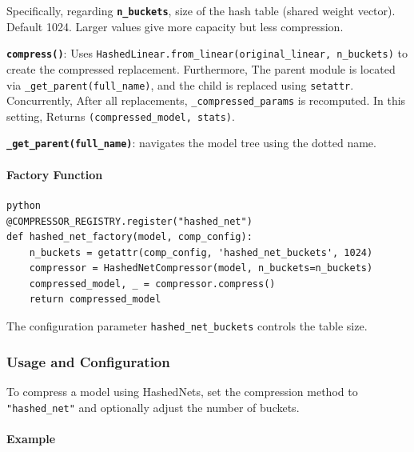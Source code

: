 Specifically, regarding \textbf{\texttt{n\_buckets}}, size of the hash table (shared weight vector). Default 1024. Larger values give more capacity but less compression.


\textbf{\texttt{compress()}}:
Uses \texttt{HashedLinear.from\_linear(original\_linear, n\_buckets)} to create the compressed replacement. Furthermore, The parent module is located via \texttt{\_get\_parent(full\_name)}, and the child is replaced using \texttt{setattr}. Concurrently, After all replacements, \texttt{\_compressed\_params} is recomputed. In this setting, Returns \texttt{(compressed\_model, stats)}.


\textbf{\texttt{\_get\_parent(full\_name)}}: navigates the model tree using the dotted name.

\paragraph{Factory Function}

\vspace{0.5em}
\begin{mdframed}[backgroundcolor=codebg, linecolor=codeframe, linewidth=1pt, roundcorner=4pt, innerleftmargin=2pt, innerrightmargin=5pt, innertopmargin=5pt, innerbottommargin=5pt]
\begin{lstlisting}
python
@COMPRESSOR_REGISTRY.register("hashed_net")
def hashed_net_factory(model, comp_config):
    n_buckets = getattr(comp_config, 'hashed_net_buckets', 1024)
    compressor = HashedNetCompressor(model, n_buckets=n_buckets)
    compressed_model, _ = compressor.compress()
    return compressed_model
\end{lstlisting}
\end{mdframed}
\vspace{0.5em}

The configuration parameter \texttt{hashed\_net\_buckets} controls the table size.


\subsubsection*{Usage and Configuration}

To compress a model using HashedNets, set the compression method to \texttt{"hashed\_net"} and optionally adjust the number of buckets.

\paragraph{Example}

